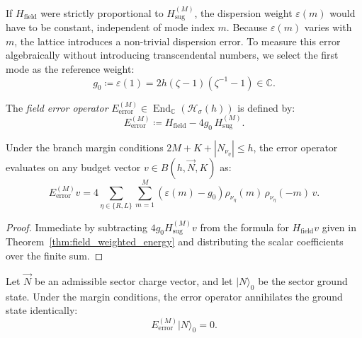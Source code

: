 If $H_{\mathrm{field}}$ were strictly proportional to $H_{\mathrm{sug}}^{(M)}$, the dispersion weight $\varepsilon(m)$ would have to be constant, independent of mode index $m$. Because $\varepsilon(m)$ varies with $m$, the lattice introduces a non-trivial dispersion error. To measure this error algebraically without introducing transcendental numbers, we select the first mode as the reference weight:
\begin{equation}
g_0 \coloneqq \varepsilon(1) = 2h (\zeta - 1)(\zeta^{-1} - 1) \in \mathbb{C}.
\end{equation}

\begin{definition}
\label{def:error_operator}
The \emph{field error operator} $E_{\mathrm{error}}^{(M)} \in \operatorname{End}_{\mathbb{C}}(\mathcal{H}_\sigma(h))$ is defined by:
\begin{equation}
E_{\mathrm{error}}^{(M)} \coloneqq H_{\mathrm{field}} - 4 g_0\, H_{\mathrm{sug}}^{(M)}.
\end{equation}
\end{definition}

\begin{lemma}
\label{lem:error_weighted_on_budget}
Under the branch margin conditions $2M + K + |N_{\nu_\eta}| \le h$, the error operator evaluates on any budget vector $v \in B(h, \vec{N}, K)$ as:
\begin{equation}
E_{\mathrm{error}}^{(M)} v = 4 \sum_{\eta \in \{R, L\}} \sum_{m=1}^M \left( \varepsilon(m) - g_0 \right) \rho_{\nu_\eta}(m)\, \rho_{\nu_\eta}(-m)\, v.
\end{equation}
\end{lemma}

\begin{proof}
Immediate by subtracting $4 g_0 H_{\mathrm{sug}}^{(M)} v$ from the formula for $H_{\mathrm{field}} v$ given in Theorem~\ref{thm:field_weighted_energy} and distributing the scalar coefficients over the finite sum.
\end{proof}

\begin{lemma}
\label{lem:ground_error_zero}
Let $\vec{N}$ be an admissible sector charge vector, and let $|N\rangle_0$ be the sector ground state. Under the margin conditions, the error operator annihilates the ground state identically:
\begin{equation}
E_{\mathrm{error}}^{(M)} |N\rangle_0 = 0.
\end{equation}
\end{lemma}

